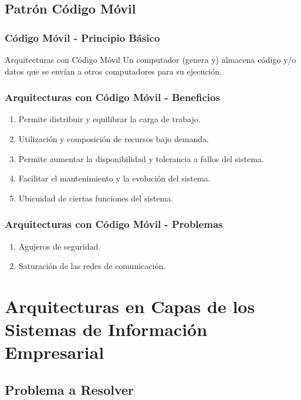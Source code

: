 \documentclass[a4paper,t,xcolor=pst,dvips,colortheme]{beamer}
\begin{document}
\subsection{Patrón Código Móvil}

\begin{frame}[c]
    \frametitle{Código Móvil - Principio Básico}
    \begin{block}{Arquitecturas con Código Móvil}
        Un computador (genera y) almacena código y/o datos que se envían a otros computadores para su ejecución.
    \end{block}
\end{frame}

\begin{frame}[c]
    \frametitle{Arquitecturas con Código Móvil - Beneficios}
    \begin{enumerate}[<+->]
        \item Permite distribuir y equilibrar la carga de trabajo.
        \item Utilización y composición de recursos bajo demanda.
        \item Permite aumentar la disponibilidad y tolerancia a fallos del sistema.
        \item Facilitar el mantenimiento y la evolución del sistema.
        \item Ubicuidad de ciertas funciones del sistema.
    \end{enumerate}
\end{frame}

\begin{frame}[c]
    \frametitle{Arquitecturas con Código Móvil - Problemas}
    \begin{enumerate}[<+->]
        \item Agujeros de seguridad.
        \item Saturación de las redes de comunicación.
    \end{enumerate}
\end{frame}

\section[Arquitecturas en Capas de los SIE]{Arquitecturas en Capas de los Sistemas de Información Empresarial}

\subsection{Problema a Resolver}
\end{document}
